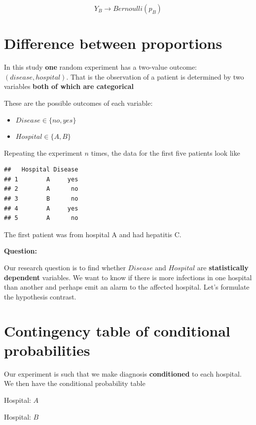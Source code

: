 \documentclass[
]{book}
\providecommand{\tightlist}{%
  \setlength{\itemsep}{0pt}\setlength{\parskip}{0pt}}
\begin{document}
\[Y_B \rightarrow Bernoulli (p_B)\]

\hypertarget{difference-between-proportions-1}{%
\section{Difference between proportions}\label{difference-between-proportions-1}}

In this study \textbf{one} random experiment has a two-value outcome: \((disease, hospital)\). That is the observation of a patient is determined by two variables \textbf{both of which are categorical}

These are the possible outcomes of each variable:

\begin{itemize}
\tightlist
\item
  \(Disease \in\{no, yes\}\)
\item
  \(Hospital \in \{A,B\}\)
\end{itemize}

Repeating the experiment \(n\) times, the data for the first five patients look like

\begin{verbatim}
##   Hospital Disease
## 1        A     yes
## 2        A      no
## 3        B      no
## 4        A     yes
## 5        A      no
\end{verbatim}

The first patient was from hospital A and had hepatitis C.

\textbf{Question:}

Our research question is to find whether \(Disease\) and \(Hospital\) are \textbf{statistically dependent} variables. We want to know if there is more infections in one hospital than another and perhaps emit an alarm to the affected hospital. Let's formulate the hypothesis contrast.

\hypertarget{contingency-table-of-conditional-probabilities}{%
\section{Contingency table of conditional probabilities}\label{contingency-table-of-conditional-probabilities}}

Our experiment is such that we make diagnosis \textbf{conditioned} to each hospital. We then have the conditional probability table

Hospital: \(A\)

Hospital: \(B\)
\end{document}
